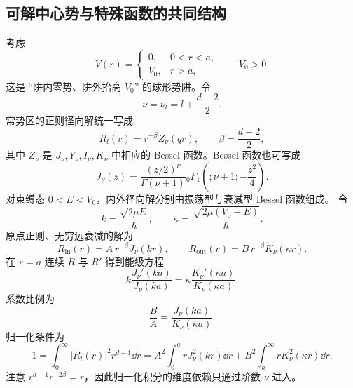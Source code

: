 \subsection{可解中心势与特殊函数的共同结构}
考虑
\begin{equation}
	V(r)=
	\begin{cases}
		0,&0<r<a,\\
		V_0,&r>a,
	\end{cases}
	\qquad V_0>0.
	\label{eq:phys-hdqm-finite-well-potential}
\end{equation}
这是 ``阱内零势、阱外抬高 \(V_0\)'' 的球形势阱。令
\begin{equation}
	\nu=\nu_l=l+\frac{d-2}{2}.
\end{equation}
常势区的正则径向解统一写成
\begin{equation}
	R_l(r)=r^{-\beta}Z_{\nu}(qr),\qquad
	\beta=\frac{d-2}{2},
\end{equation}
其中 \(Z_\nu\) 是 \(J_\nu,Y_\nu,I_\nu,K_\nu\) 中相应的 Bessel 函数。Bessel 函数也可写成
\begin{equation}
	J_\nu(z)=\frac{(z/2)^\nu}{\Gamma(\nu+1)}
	{}_0F_1\left(;\nu+1;-\frac{z^2}{4}\right).
	\label{eq:phys-hdqm-bessel-0f1}
\end{equation}
对束缚态 $0<E<V_0$，内外径向解分别由振荡型与衰减型 Bessel 函数组成。
令
\begin{equation}
	k=\frac{\sqrt{2\mu E}}{\hbar},\qquad
	\kappa=\frac{\sqrt{2\mu(V_0-E)}}{\hbar}.
\end{equation}
原点正则、无穷远衰减的解为
\begin{equation}
	R_{\mathrm{in}}(r)=A\,r^{-\beta}J_\nu(kr),\qquad
	R_{\mathrm{out}}(r)=B\,r^{-\beta}K_\nu(\kappa r).
	\label{eq:phys-hdqm-finite-well-bound-wave}
\end{equation}
在 \(r=a\) 连续 \(R\) 与 \(R'\) 得到能级方程
\begin{equation}
	k\frac{J_\nu'(ka)}{J_\nu(ka)}
	=
	\kappa\frac{K_\nu'(\kappa a)}{K_\nu(\kappa a)}.
	\label{eq:phys-hdqm-finite-well-bound-condition}
\end{equation}
系数比例为
\begin{equation}
	\frac{B}{A}=\frac{J_\nu(ka)}{K_\nu(\kappa a)}.
\end{equation}
归一化条件为
\begin{equation}
	1=\int_0^\infty |R_l(r)|^2r^{d-1}\dd r
	=A^2\int_0^a rJ_\nu^2(kr)\dd r
	+B^2\int_a^\infty rK_\nu^2(\kappa r)\dd r.
\end{equation}
注意 \(r^{d-1}r^{-2\beta}=r\)，因此归一化积分的维度依赖只通过阶数 \(\nu\) 进入。
